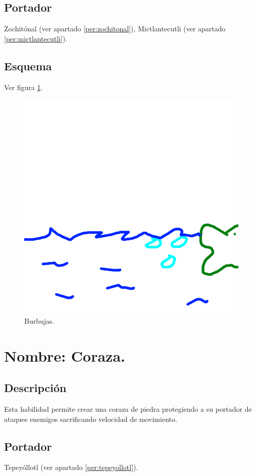 \subsection{Portador}
Zochitónal (ver apartado \ref{per:zochitonal}),  Mictlantecutli (ver apartado \ref{per:mictlantecutli}).
\subsection{Esquema}
			Ver figura \ref{fig:burbujas}.
			\begin{figure}
				\centering
				\includegraphics[height=0.2 \textheight]{Imagenes/burbujas}
				\caption{Burbujas.}
				\label{fig:burbujas}
			\end{figure}

\section{Nombre: Coraza.}\label{hab.coraza}
\subsection{Descripción}
Esta habilidad permite crear una coraza de piedra protegiendo a su portador de ataques enemigos sacrificando velocidad de movimiento.  
\subsection{Portador}
Tepeyóllotl (ver apartado \ref{per:tepeyollotl}).
